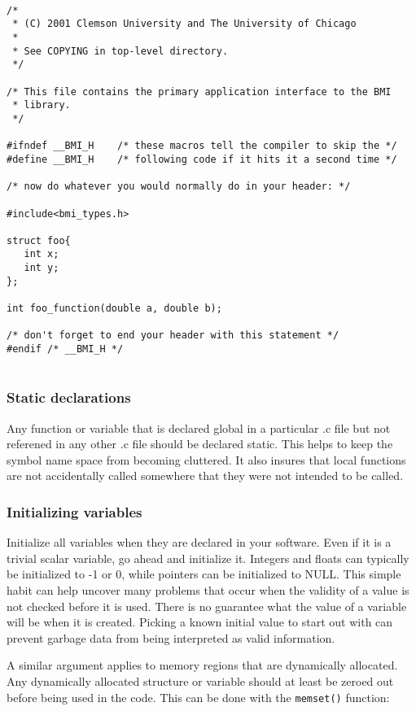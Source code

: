 \documentclass[11pt, letterpaper]{article}
\begin{document}
\begin{verbatim}

/*
 * (C) 2001 Clemson University and The University of Chicago
 *
 * See COPYING in top-level directory.
 */

/* This file contains the primary application interface to the BMI
 * library.
 */

#ifndef __BMI_H    /* these macros tell the compiler to skip the */
#define __BMI_H    /* following code if it hits it a second time */

/* now do whatever you would normally do in your header: */

#include<bmi_types.h>

struct foo{
   int x;
   int y;
};

int foo_function(double a, double b);

/* don't forget to end your header with this statement */
#endif /* __BMI_H */   


\end{verbatim}

\subsubsection{Static declarations}

\label{sec:static}
Any function or variable that is declared global in a particular .c file
but not referened in any other .c file should be declared static.  This
helps to keep the symbol name space from becoming cluttered.  It also
insures that local functions are not accidentally called somewhere that
they were not intended to be called.
\subsubsection{Initializing variables}

Initialize all variables when they are declared in your software.  Even if it is a trivial
scalar variable, go ahead and initialize it.  Integers and floats can
typically be initialized to -1 or 0, while pointers can be initialized
to NULL.  This simple habit can help uncover many problems that occur
when the validity of a value is not checked before it is used.  There is
no guarantee what the value of a variable will be when it is
created.  Picking a known initial value to start out with can prevent
garbage data from being interpreted as valid information.

A similar argument applies to memory regions that are dynamically
allocated.  Any dynamically allocated structure or variable should at
least be zeroed out before being used in the code.  This can be done
with the {\tt memset()} function:
\end{document}
